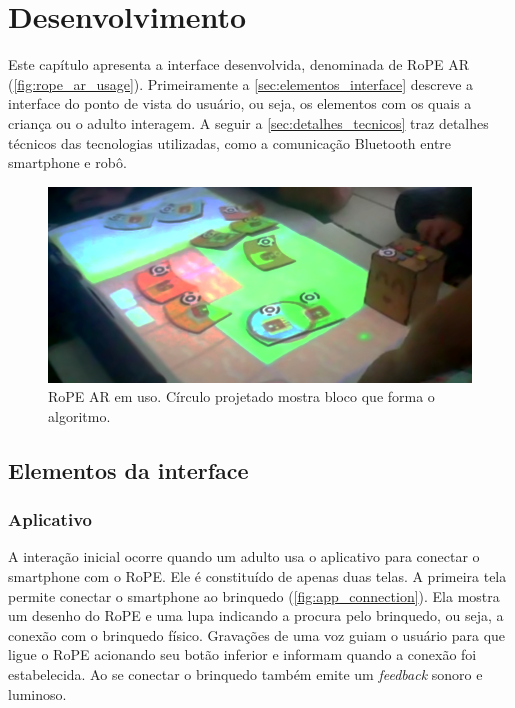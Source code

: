 \chapter{Desenvolvimento}
\label{c_desenvolvimento}

Este capítulo apresenta a interface desenvolvida, denominada de RoPE AR (\autoref{fig:rope_ar_usage}). Primeiramente a \autoref{sec:elementos_interface} descreve a interface do ponto de vista do usuário, ou seja, os elementos com os quais a criança ou o adulto interagem. A seguir a \autoref{sec:detalhes_tecnicos} traz detalhes técnicos das tecnologias utilizadas, como a comunicação Bluetooth entre smartphone e robô.

\begin{figure}[!h]
    \centering
    \includegraphics[width=0.7\linewidth,fbox]{figs/wide_interface.png}
    \caption{RoPE AR em uso. Círculo projetado mostra bloco que forma o algoritmo. }
    \label{fig:rope_ar_usage}
\end{figure}

\section{Elementos da interface}
\label{sec:elementos_interface}
\subsection{Aplicativo}
A interação inicial ocorre quando um adulto usa o aplicativo para conectar o smartphone com o RoPE. Ele é constituído de apenas duas telas. A primeira tela permite conectar o smartphone ao brinquedo (\autoref{fig:app_connection}). Ela mostra um desenho do RoPE e uma lupa indicando a procura pelo brinquedo, ou seja, a conexão com o brinquedo físico. Gravações de uma voz guiam o usuário para que ligue o RoPE acionando seu botão inferior e informam quando a conexão foi estabelecida. Ao se conectar o brinquedo também emite um \textit{feedback} sonoro e luminoso.

